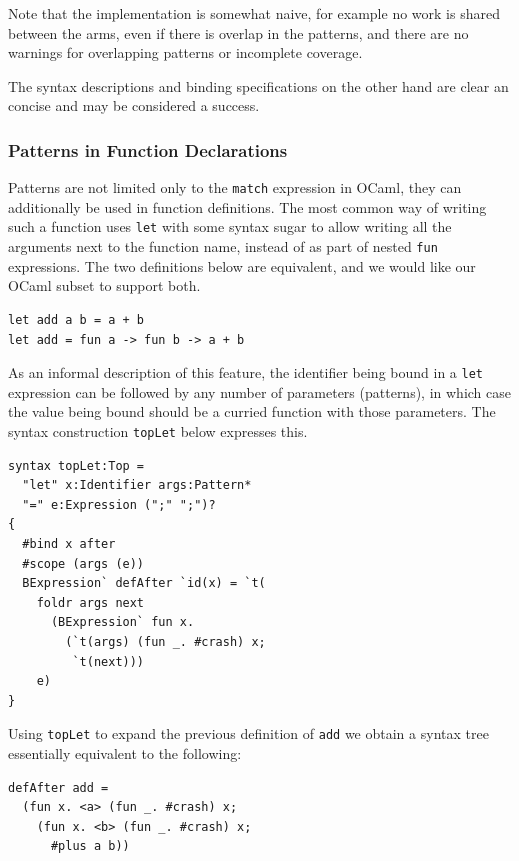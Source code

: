 \documentclass{kththesis}
\begin{document}
Note that the implementation is somewhat naive, for example no work is shared between the arms, even if there is overlap in the patterns, and there are no warnings for overlapping patterns or incomplete coverage.

The syntax descriptions and binding specifications on the other hand are clear an concise and may be considered a success.

\subsubsection{Patterns in Function Declarations}
\label{sec:ocaml-function-argument-patterns}

Patterns are not limited only to the \texttt{match} expression in OCaml, they can additionally be used in function definitions. The most common way of writing such a function uses \texttt{let} with some syntax sugar to allow writing all the arguments next to the function name, instead of as part of nested \texttt{fun} expressions. The two definitions below are equivalent, and we would like our OCaml subset to support both.

\begin{verbatim}
let add a b = a + b
let add = fun a -> fun b -> a + b
\end{verbatim}

As an informal description of this feature, the identifier being bound in a \texttt{let} expression can be followed by any number of parameters (patterns), in which case the value being bound should be a curried function with those parameters. The syntax construction \texttt{topLet} below expresses this.

\begin{verbatim}
syntax topLet:Top =
  "let" x:Identifier args:Pattern*
  "=" e:Expression (";" ";")?
{
  #bind x after
  #scope (args (e))
  BExpression` defAfter `id(x) = `t(
    foldr args next
      (BExpression` fun x.
        (`t(args) (fun _. #crash) x;
         `t(next)))
    e)
}
\end{verbatim}

Using \texttt{topLet} to expand the previous definition of \texttt{add} we obtain a syntax tree essentially equivalent to the following:

\begin{verbatim}
defAfter add =
  (fun x. <a> (fun _. #crash) x;
    (fun x. <b> (fun _. #crash) x;
      #plus a b))
\end{verbatim}
\end{document}
